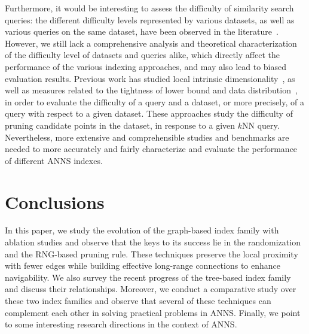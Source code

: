 \documentclass[11pt]{article}
\begin{document}
Furthermore, it would be interesting to assess the difficulty of similarity search queries: the different difficulty levels represented by various datasets, as well as various queries on the same dataset, have been observed in the literature~\cite{hardness,lid}. 
However, we still lack a comprehensive analysis and theoretical characterization of the difficulty level of datasets and queries alike, which directly affect the performance of the various indexing approaches, and may also lead to biased evaluation results.
Previous work has studied local intrinsic dimensionality~\cite{lid}, as well as measures related to the tightness of lower bound and data distribution~\cite{hardness}, in order to evaluate the difficulty of a query and a dataset, or more precisely, of a query with respect to a given dataset.
These approaches study the difficulty of pruning candidate points in the dataset, in response to a given $k$NN query. 
Nevertheless, more extensive and comprehensible studies and benchmarks are needed to more accurately and fairly characterize and evaluate the performance of different ANNS indexes. 

\section{Conclusions}
\label{zeyu_sec:conclude}
In this paper, we study the evolution of the graph-based index family with ablation studies and observe that the keys to its success lie in the randomization and the RNG-based pruning rule.
These techniques preserve the local proximity with fewer edges while building effective long-range connections to enhance navigability. 
We also survey the recent progress of the tree-based index family and discuss their relationships.
Moreover, we conduct a comparative study over these two index families and observe that several of these techniques can complement each other in solving practical problems in ANNS. 
Finally, we point to some interesting research directions in the context of ANNS.
\end{document}
